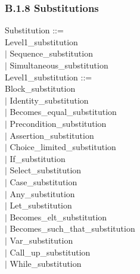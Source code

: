 \documentclass[12pt,a4paper,draft]{article}
\begin{document}
\subsubsection{B.1.8 Substitutions }
\footnotesize{
\begin{sloppypar} 
Substitution ::= \\ 
   Level1\_substitution\\ 
\hspace*{0.20in} $|$  Sequence\_substitution\\ 
\hspace*{0.20in} $|$  Simultaneous\_substitution\\ 
Level1\_substitution ::= \\ 
   Block\_substitution\\ 
\hspace*{0.20in} $|$  Identity\_substitution\\ 
\hspace*{0.20in} $|$  Becomes\_equal\_substitution\\ 
\hspace*{0.20in} $|$  Precondition\_substitution\\ 
\hspace*{0.20in} $|$  Assertion\_substitution\\ 
\hspace*{0.20in} $|$  Choice\_limited\_substitution\\ 
\hspace*{0.20in} $|$  If\_substitution\\ 
\hspace*{0.20in} $|$  Select\_substitution\\ 
\hspace*{0.20in} $|$  Case\_substitution\\ 
\hspace*{0.20in} $|$  Any\_substitution\\ 
\hspace*{0.20in} $|$  Let\_substitution\\ 
\hspace*{0.20in} $|$  Becomes\_elt\_substitution\\ 
\hspace*{0.20in} $|$  Becomes\_such\_that\_substitution\\ 
\hspace*{0.20in} $|$  Var\_substitution\\ 
\hspace*{0.20in} $|$  Call\_up\_substitution\\ 
\hspace*{0.20in} $|$  While\_substitution\\ 

\end{sloppypar}}
\end{document}
